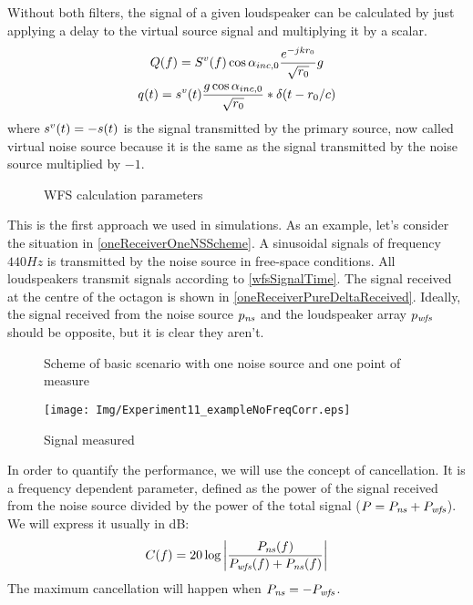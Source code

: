 Without both filters, the signal of a given loudspeaker can be calculated by just applying a delay to the virtual source signal and multiplying it by a scalar.
\begin{gather}
\signal[wfs][frequency](f) = \signal[nsVirt][frequency](f) \cos\normPrimaryPropAngleSection \frac{e^{-jk\distLinePrimSource}}{\sqrt{\distLinePrimSource}} g
\\
\signal[wfs][time](t) = \signal[nsVirt][time](t) \frac{g \cos\normPrimaryPropAngleSection}{\sqrt{\distLinePrimSource}}
\ast\delta(t - \distLinePrimSource/c)
\label{wfsSignalTime}
\end{gather}
where $\signal[nsVirt][time](t) = -\signal[ns][time](t)$ is the signal transmitted by the primary source, now called virtual noise source because it is the same as the signal transmitted by the noise source multiplied by $-1$.
\begin{figure}
	\centering
	\def\svgwidth{0.4\columnwidth}
	\graphicspath{{Img/}}
	
	\caption[WFS calculation parameters]{WFS calculation parameters}
	\label{figAngleCondition}
\end{figure}

This is the first approach we used in simulations. As an example, let's consider the situation in \autoref{oneReceiverOneNSScheme}. A sinusoidal signals of frequency $440 \si{Hz}$ is transmitted by the noise source in free-space conditions. All loudspeakers transmit signals according to \autoref{wfsSignalTime}. The signal received at the centre of the octagon is shown in \autoref{oneReceiverPureDeltaReceived}. Ideally, the signal received from the noise source $\Field[ns][time]$ and the loudspeaker array $\Field[wfs][time]$ should be opposite, but it is clear they aren't.

\begin{figure}
	\centering
	\caption[Scheme of basic scenario]{Scheme of basic scenario with one noise source and one point of measure}
	\label{oneReceiverOneNSScheme}
\end{figure}

\begin{figure}
	\centering
	\texttt{[image: Img/Experiment11\_exampleNoFreqCorr.eps]}
	\caption{Signal measured}
	\label{oneReceiverPureDeltaReceived}
\end{figure}

In order to quantify the performance, we will use the concept of cancellation. It is a frequency dependent parameter, defined as the power of the signal received from the noise source divided by the power of the total signal ($\Field[total][frequency] = \Field[ns][frequency] + \Field[wfs][frequency]$). We will express it usually in dB:
\begin{equation}
\cancellation(f) = 20\log{\left\lvert\frac{\Field[ns][frequency](f)}{\Field[wfs][frequency](f) + \Field[ns][frequency](f)}\right\rvert}
\end{equation}
The maximum cancellation will happen when $\Field[ns][frequency] = -\Field[wfs][frequency]$.


